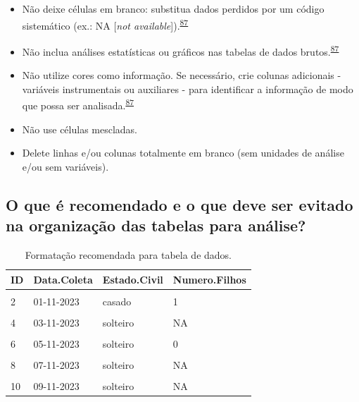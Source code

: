 \documentclass[
  a4paper,
]{book}
\begin{document}
\begin{itemize}
\item
  Não deixe células em branco: substitua dados perdidos por um código sistemático (ex.: NA {[}\emph{not available}{]}).\textsuperscript{\protect\hyperlink{ref-broman2018}{87}}
\item
  Não inclua análises estatísticas ou gráficos nas tabelas de dados brutos.\textsuperscript{\protect\hyperlink{ref-broman2018}{87}}
\item
  Não utilize cores como informação. Se necessário, crie colunas adicionais - variáveis instrumentais ou auxiliares - para identificar a informação de modo que possa ser analisada.\textsuperscript{\protect\hyperlink{ref-broman2018}{87}}
\item
  Não use células mescladas.
\item
  Delete linhas e/ou colunas totalmente em branco (sem unidades de análise e/ou sem variáveis).
\end{itemize}

\hypertarget{o-que-uxe9-recomendado-e-o-que-deve-ser-evitado-na-organizauxe7uxe3o-das-tabelas-para-anuxe1lise}{%
\subsection{O que é recomendado e o que deve ser evitado na organização das tabelas para análise?}\label{o-que-uxe9-recomendado-e-o-que-deve-ser-evitado-na-organizauxe7uxe3o-das-tabelas-para-anuxe1lise}}

\begin{table}

\caption{\label{tab:tabela-recomendada}Formatação recomendada para tabela de dados.}
\centering
\begin{tabu} to 
\toprule
\textbf{ID} & \textbf{Data.Coleta} & \textbf{Estado.Civil} & \textbf{Numero.Filhos}\\
\midrule
{} &  &  & \\
2 & 01-11-2023 & casado & 1\\
 &  &  & \\
4 & 03-11-2023 & solteiro & NA\\
 &  &  & \\
6 & 05-11-2023 & solteiro & 0\\
 &  &  & \\
8 & 07-11-2023 & solteiro & NA\\
 &  &  & \\
10 & 09-11-2023 & solteiro & NA\\
\bottomrule
\end{tabu}
\end{table}
\end{document}
